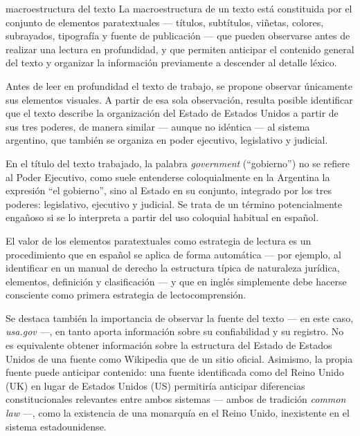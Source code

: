 \documentclass[12pt,oneside]{book}
\begin{document}
\begin{definition}{macroestructura del texto}
La macroestructura de un texto está constituida por el conjunto de elementos paratextuales --- títulos, subtítulos, viñetas, colores, subrayados, tipografía y fuente de publicación --- que pueden observarse antes de realizar una lectura en profundidad, y que permiten anticipar el contenido general del texto y organizar la información previamente a descender al detalle léxico.
\end{definition}

Antes de leer en profundidad el texto de trabajo, se propone observar únicamente sus elementos visuales. A partir de esa sola observación, resulta posible identificar que el texto describe la organización del Estado de Estados Unidos a partir de sus tres poderes, de manera similar --- aunque no idéntica --- al sistema argentino, que también se organiza en poder ejecutivo, legislativo y judicial.

\begin{important}
En el título del texto trabajado, la palabra \textit{government} (``gobierno'') no se refiere al Poder Ejecutivo, como suele entenderse coloquialmente en la Argentina la expresión ``el gobierno'', sino al Estado en su conjunto, integrado por los tres poderes: legislativo, ejecutivo y judicial. Se trata de un término potencialmente engañoso si se lo interpreta a partir del uso coloquial habitual en español.
\end{important}

El valor de los elementos paratextuales como estrategia de lectura es un procedimiento que en español se aplica de forma automática --- por ejemplo, al identificar en un manual de derecho la estructura típica de naturaleza jurídica, elementos, definición y clasificación --- y que en inglés simplemente debe hacerse consciente como primera estrategia de lectocomprensión.

Se destaca también la importancia de observar la fuente del texto --- en este caso, \textit{usa.gov} ---, en tanto aporta información sobre su confiabilidad y su registro. No es equivalente obtener información sobre la estructura del Estado de Estados Unidos de una fuente como Wikipedia que de un sitio oficial. Asimismo, la propia fuente puede anticipar contenido: una fuente identificada como del Reino Unido (UK) en lugar de Estados Unidos (US) permitiría anticipar diferencias constitucionales relevantes entre ambos sistemas --- ambos de tradición \textit{common law} ---, como la existencia de una monarquía en el Reino Unido, inexistente en el sistema estadounidense.
\end{document}
